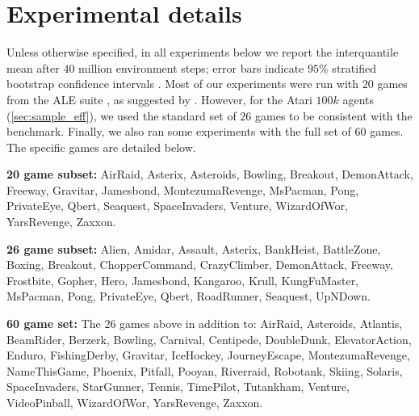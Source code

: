\section{Experimental details}
\label{sec:atari_2600}

Unless otherwise specified, in all experiments below we report the interquantile mean after $40$ million environment steps; error bars indicate $95\%$ stratified bootstrap confidence intervals \citep{agarwal2021deep}. Most of our experiments were run with $20$ games from the ALE suite \citep{Bellemare_2013}, as suggested by \citet{fedus2020revisiting}. However, for the Atari $100k$ agents (\autoref{sec:sample_eff}), we used the standard set of $26$ games \citep{kaiser2020model} to be consistent with the benchmark. Finally, we also ran some experiments with the full set of $60$ games. The specific games are detailed below.

\textbf{20 game subset:} AirRaid, Asterix, Asteroids, Bowling, Breakout, DemonAttack, Freeway, Gravitar, Jamesbond, MontezumaRevenge, MsPacman, Pong, PrivateEye, Qbert, Seaquest, SpaceInvaders, Venture,         WizardOfWor, YarsRevenge, Zaxxon.

\textbf{26 game subset:} Alien, Amidar, Assault, Asterix, BankHeist, BattleZone, Boxing, Breakout, ChopperCommand, CrazyClimber, DemonAttack, Freeway, Frostbite, Gopher, Hero, Jamesbond, Kangaroo, Krull, KungFuMaster, MsPacman, Pong, PrivateEye, Qbert, RoadRunner, Seaquest, UpNDown.

\textbf{60 game set:} The 26 games above in addition to: AirRaid, Asteroids, Atlantis, BeamRider, Berzerk, Bowling, Carnival, Centipede, DoubleDunk, ElevatorAction, Enduro, FishingDerby, Gravitar, IceHockey, JourneyEscape, MontezumaRevenge, NameThisGame, Phoenix, Pitfall, Pooyan, Riverraid, Robotank, Skiing, Solaris, SpaceInvaders, StarGunner, Tennis, TimePilot, Tutankham, Venture, VideoPinball, WizardOfWor, YarsRevenge, Zaxxon.

